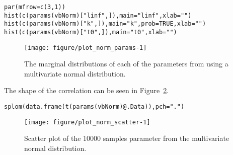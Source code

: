 \documentclass[a4paper,english,10pt]{article}\usepackage[]{graphicx}\usepackage[]{color}
\makeatletter
\def\maxwidth{ %
  \ifdim\Gin@nat@width>\linewidth
    \linewidth
  \else
    \Gin@nat@width
  \fi
}
\newcommand{\hlnum}[1]{\textcolor[rgb]{0.2,0.2,0.2}{#1}}%
\newcommand{\hlstr}[1]{\textcolor[rgb]{0.2,0.2,0.2}{#1}}%
\newcommand{\hlopt}[1]{\textcolor[rgb]{0.2,0.2,0.2}{#1}}%
\newcommand{\hlstd}[1]{\textcolor[rgb]{0,0,0}{#1}}%
\newcommand{\hlkwc}[1]{\textcolor[rgb]{0.361,0.506,0.596}{#1}}%
\newcommand{\hlkwd}[1]{\textcolor[rgb]{0.361,0.506,0.596}{#1}}%
\newenvironment{kframe}{%
 \def\at@end@of@kframe{}%
 \ifinner\ifhmode%
  \def\at@end@of@kframe{\end{minipage}}%
  \begin{minipage}{\columnwidth}%
 \fi\fi%
 \def\FrameCommand##1{\hskip\@totalleftmargin \hskip-\fboxsep
 \colorbox{shadecolor}{##1}\hskip-\fboxsep
     \hskip-\linewidth \hskip-\@totalleftmargin \hskip\columnwidth}%
 \MakeFramed {\advance\hsize-\width
   \@totalleftmargin\z@ \linewidth\hsize
   \@setminipage}}%
 {\par\unskip\endMakeFramed%
 \at@end@of@kframe}
\newenvironment{knitrout}{}{} %
\makeatother
\begin{document}
\begin{knitrout}
\color{fgcolor}\begin{kframe}
\begin{alltt}
\hlkwd{par}\hlstd{(}\hlkwc{mfrow}\hlstd{=}\hlkwd{c}\hlstd{(}\hlnum{3}\hlstd{,}\hlnum{1}\hlstd{))}
\hlkwd{hist}\hlstd{(}\hlkwd{c}\hlstd{(}\hlkwd{params}\hlstd{(vbNorm)[}\hlstr{"linf"}\hlstd{,]),} \hlkwc{main}\hlstd{=}\hlstr{"linf"}\hlstd{,} \hlkwc{xlab}\hlstd{=}\hlstr{""}\hlstd{)}
\hlkwd{hist}\hlstd{(}\hlkwd{c}\hlstd{(}\hlkwd{params}\hlstd{(vbNorm)[}\hlstr{"k"}\hlstd{,]),} \hlkwc{main}\hlstd{=}\hlstr{"k"}\hlstd{,} \hlkwc{prob}\hlstd{=}\hlnum{TRUE}\hlstd{,} \hlkwc{xlab}\hlstd{=}\hlstr{""}\hlstd{)}
\hlkwd{hist}\hlstd{(}\hlkwd{c}\hlstd{(}\hlkwd{params}\hlstd{(vbNorm)[}\hlstr{"t0"}\hlstd{,]),} \hlkwc{main}\hlstd{=}\hlstr{"t0"}\hlstd{,} \hlkwc{xlab}\hlstd{=}\hlstr{""}\hlstd{)}
\end{alltt}
\end{kframe}\begin{figure}[H]

{\centering \texttt{[image: figure/plot\_norm\_params-1]} 

}

\caption[The marginal distributions of each of the parameters from using a multivariate normal distribution]{The marginal distributions of each of the parameters from using a multivariate normal distribution.\label{fig:plot_norm_params}}
\end{figure}


\end{knitrout}

The shape of the correlation can be seen in Figure~\ref{fig:plot_norm_scatter}.
\begin{knitrout}
\color{fgcolor}\begin{kframe}
\begin{alltt}
\hlkwd{splom}\hlstd{(}\hlkwd{data.frame}\hlstd{(}\hlkwd{t}\hlstd{(}\hlkwd{params}\hlstd{(vbNorm)}\hlopt{@}\hlkwc{.Data}\hlstd{)),} \hlkwc{pch}\hlstd{=}\hlstr{"."}\hlstd{)}
\end{alltt}
\end{kframe}\begin{figure}[H]

{\centering \texttt{[image: figure/plot\_norm\_scatter-1]} 

}

\caption[Scatter plot of the 10000 samples parameter from the multivariate normal distribution]{Scatter plot of the 10000 samples parameter from the multivariate normal distribution.\label{fig:plot_norm_scatter}}
\end{figure}


\end{knitrout}
\end{document}
